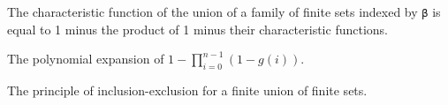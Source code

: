 \begin{lemma}\label{char_fun_FinUnion}
  The characteristic function of the union of a family of finite sets indexed by \verb|β| is equal to 1 minus the product of 1 minus their characteristic functions.
\end{lemma}

\begin{lemma}\label{mul_expand₀}
  The polynomial expansion of \(1 - \prod_{i=0}^{n-1} (1 - g(i))\).
\end{lemma}

\begin{theorem}\label{Principle_of_Inclusion_Exclusion}
  The principle of inclusion-exclusion for a finite union of finite sets.
\end{theorem}

